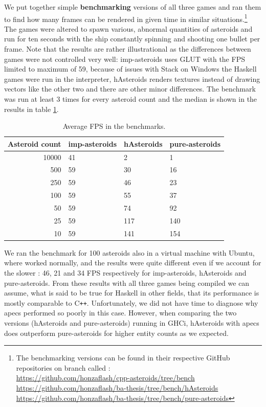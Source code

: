 \documentclass[
  digital, %
  color,   %
  table,   %
  oneside, %
  lof,     %
  lot,     %
]{fithesis3}
\newcommand{\cpp}{C\nolinebreak\texttt{+}\nolinebreak\texttt{+}}
\begin{document}
{We put together simple \textbf{benchmarking} versions of all three games and ran them
to find how many frames can be rendered in given time in similar situations.\footnote{
The benchmarking versions can be found in their respective GitHub repositories
on branch called :\\
\url{https://github.com/honzaflash/cpp-asteroids/tree/bench}\\
\url{https://github.com/honzaflash/ba-thesis/tree/bench/hAsteroids}\\
\url{https://github.com/honzaflash/ba-thesis/tree/bench/pure-asteroids}
}
The games were altered to spawn various, abnormal quantities of asteroids and
run for ten seconds with the ship constantly spinning and shooting one bullet per frame.
Note that the results are rather illustrational as the differences between games were not controlled
very well: imp-asteroids uses GLUT with the FPS limited to maximum of 59, because of issues
with Stack on Windows the Haskell games were run in the interpreter, hAsteroids renders
textures instead of drawing vectors like the other two and there are other minor differences.
The benchmark was run at least 3 times for every asteroid count and the median is shown
in the results in table \ref{tab:benchfps}.

\begin{table}
  \begin{tabularx}{\textwidth}{|r|llX|}
    \toprule
    Asteroid count & \textbf{imp-asteroids} & \textbf{hAsteroids} & \textbf{pure-asteroids} \\
    \midrule
    10000 & 41 & 2   & 1   \\
    500   & 59 & 30  & 16    \\
    250   & 59 & 46  & 23    \\
    100   & 59 & 55  & 37 \\
    50    & 59 & 74  & 92 \\
    25    & 59 & 117 & 140 \\
    10    & 59 & 141 & 154 \\
    \bottomrule
  \end{tabularx}
  \caption{Average FPS in the benchmarks.}
  \label{tab:benchfps}
\end{table}

We ran the benchmark for 100 asteroids also in a virtual machine with Ubuntu,
where  worked normally, and the results were quite different
even if we account for the slower :
46, 21 and 34 FPS respectively for imp-asteroids, hAsteroids and pure-asteroids.
From these results with all three games being compiled we can assume,
what is said to be true for Haskell in other fields,
that its performance is mostly comparable to \cpp{}.
Unfortunately, we did not have time to diagnose why apecs performed so poorly in this case.
However, when comparing the two versions (hAsteroids and pure-asteroids) running in GHCi,
hAsteroids with apecs does outperform pure-asteroids for higher entity counts as we expected.

}
\end{document}
